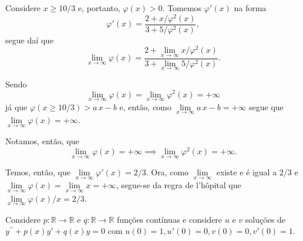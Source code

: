 \documentclass{IMTexam}
\begin{document}
\begin{questions}
\begin{parts}
            \begin{solution}
                Considere $x\geqslant 10/3$ e, portanto, $\varphi(x)>0$.
                Tomemos $\varphi'(x)$ na forma
                \[ \varphi'(x)=\dfrac{2+x/\varphi^2(x)}{3+5/\varphi^2(x)}, \]
                segue daí que
                \[ \lim\limits_{x\to\infty}
                \varphi(x)=\dfrac{2+\lim\limits_{x\to\infty}x/\varphi^2(x)}
                {3+\lim\limits_{x\to\infty}5/\varphi^2(x)}.
                \]

                Sendo
                \[ \lim\limits_{x\to\infty}\varphi(x)=\lim\limits_{x\to\infty}\varphi^2(x)=+\infty\]
                já que $\varphi(x\geqslant 10/3)>a\,x-b$ e, então, como
                $\lim\limits_{x\to\infty}a\,x-b=+\infty$ segue que
                $\lim\limits_{x\to\infty} \varphi(x)=+\infty$.

                Notamos, então, que
                \[ \lim\limits_{x\to\infty} \varphi(x)=+\infty \implies
                \lim\limits_{x\to\infty} \varphi^2(x)=+\infty. \]

                Temos, então, que $\lim\limits_{x\to\infty}\varphi'(x)=2/3$.
                Ora, como $\lim\limits_{x\to\infty}$ existe e é igual a $2/3$
                e
                $\lim\limits_{x\to\infty}\varphi(x)=\lim\limits_{x\to\infty}x=+\infty$,
                segue-se da regra de l'hôpital que
                $\lim\limits_{x\to\infty}\varphi(x)/x=2/3$.
            \end{solution}

        \end{parts}

        \question Considere $p\colon\mathbb{R}\longrightarrow\mathbb{R}$ e
        $q\colon\mathbb{R}\longrightarrow\mathbb{R}$ funções contínuas e
        considere $u$ e $v$ soluções de $y^{\prime\prime}+p(x)y'+q(x)y=0$ com
        $u(0)=1,u'(0)=0,v(0)=0,v'(0)=1$.

\end{questions}
\end{document}
